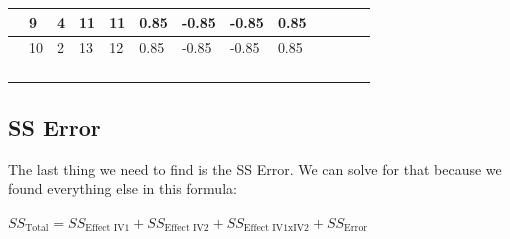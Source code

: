 \documentclass[
  letterpaper,
  DIV=11,
  numbers=noendperiod]{scrreprt}
\begin{document}
\begin{table}
\begin{tabular}{l|l|l|l|l|l|l|l|l|>{}l|>{}l|>{}l|>{}l}
\hline
 & 9 & 4 & 11 & 11 & 0.85 & -0.85 & -0.85 & 0.85 & \cellcolor{yellow}{0.7225} & \cellcolor{yellow}{0.7225} & \cellcolor{yellow}{0.7225} & \cellcolor{yellow}{0.7225}\\
\hline
 & 10 & 2 & 13 & 12 & 0.85 & -0.85 & -0.85 & 0.85 & \cellcolor{yellow}{0.7225} & \cellcolor{yellow}{0.7225} & \cellcolor{yellow}{0.7225} & \cellcolor{yellow}{0.7225}\\
\hline
\cellcolor{lightgray}{Means} & \cellcolor{lightgray}{9.6} & \cellcolor{lightgray}{3.6} & \cellcolor{lightgray}{12.6} & \cellcolor{lightgray}{10} & \cellcolor{lightgray}{} & \cellcolor{lightgray}{} & \cellcolor{lightgray}{} & \cellcolor{lightgray}{} & \cellcolor{yellow}{} & \cellcolor{yellow}{} & \cellcolor{yellow}{} & \cellcolor{yellow}{}\\
\hline
\cellcolor{lightgray}{Grand Mean} & \cellcolor{lightgray}{8.95} & \cellcolor{lightgray}{} & \cellcolor{lightgray}{} & \cellcolor{lightgray}{} & \cellcolor{lightgray}{} & \cellcolor{lightgray}{} & \cellcolor{lightgray}{} & \cellcolor{lightgray}{} & \cellcolor{yellow}{} & \cellcolor{yellow}{} & \cellcolor{yellow}{} & \cellcolor{yellow}{}\\
\hline
\cellcolor{yellow}{sums} & \cellcolor{yellow}{} & \cellcolor{yellow}{} & \cellcolor{yellow}{} & \cellcolor{yellow}{} & \cellcolor{yellow}{} & \cellcolor{yellow}{} & \cellcolor{yellow}{} & \cellcolor{yellow}{Sums} & \cellcolor{yellow}{3.6125} & \cellcolor{yellow}{3.6125} & \cellcolor{yellow}{3.6125} & \cellcolor{yellow}{3.6125}\\
\hline
\cellcolor{yellow}{SS Interaction} & \cellcolor{yellow}{} & \cellcolor{yellow}{} & \cellcolor{yellow}{} & \cellcolor{yellow}{} & \cellcolor{yellow}{} & \cellcolor{yellow}{} & \cellcolor{yellow}{} & \cellcolor{yellow}{SS Interaction} & \cellcolor{yellow}{14.45} & \cellcolor{yellow}{} & \cellcolor{yellow}{} & \cellcolor{yellow}{}\\
\hline
\end{tabular}
\end{table}

\subsection{SS Error}\label{ss-error-1}

The last thing we need to find is the SS Error. We can solve for that
because we found everything else in this formula:

\(SS_\text{Total} = SS_\text{Effect IV1} + SS_\text{Effect IV2} + SS_\text{Effect IV1xIV2} + SS_\text{Error}\)
\end{document}
